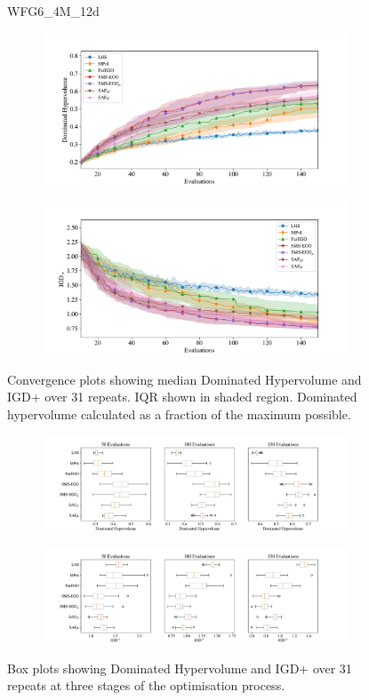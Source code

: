 \documentclass[conference]{IEEEtran}
\begin{document}
\begin{figure}
WFG6\_4M\_12d


\begin{subfigure}[hbt!]{\linewidth}

    \centering
    \includegraphics[width=0.7\linewidth]{figures/wfg6_4obj_12dim_hv_plot.pdf}
\end{subfigure}
\begin{subfigure}[h]{\linewidth}
    \centering
    \includegraphics[width=0.7\linewidth]{figures/wfg6_4obj_12dim_igd_plot.pdf}
\end{subfigure}
    \caption{Convergence plots showing median Dominated Hypervolume and IGD+ over 31 repeats. IQR shown in shaded region. Dominated hypervolume calculated as a fraction of the maximum possible.}
\vspace{\floatsep}
\begin{subfigure}[t]{\linewidth}
    \centering
    \includegraphics[width=0.8\linewidth]{figures/wfg6_4obj_12dim_hv_boxplot.pdf}
\end{subfigure}
\begin{subfigure}[t]{\linewidth}
    \centering
    \includegraphics[width=0.8\linewidth]{figures/wfg6_4obj_12dim_igd_boxplot.pdf}
\end{subfigure}
    \caption{Box plots showing Dominated Hypervolume and IGD+ over 31 repeats at three stages of the optimisation process.}
\end{figure}
\clearpage
\end{document}
